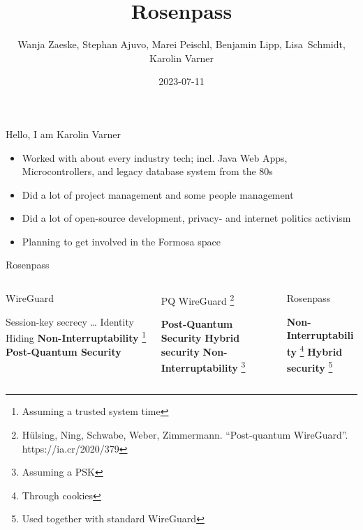 \documentclass{rosenpass-beamer}
\title{Rosenpass}
\author{
Wanja Zaeske, Stephan Ajuvo, Marei Peischl, Benjamin Lipp, Lisa~Schmidt, Karolin Varner
}
\institute{\url{https://rosenpass.eu}}
\date{2023-07-11}
\newcommand*{\heading}[1]{%
  {%
    \hspace*{-0.5cm}#1
    \vspace{1.0em}%
  }%
}
\begin{document}
\maketitle

\begin{frame}{Hello, I am Karolin Varner}
\begin{itemize}
  \item Worked with about every industry tech; incl. Java Web Apps, Microcontrollers, and legacy database system from the 80s
  \item Did a lot of project management and some people management
  \item Did a lot of open-source development, privacy- and internet politics activism
  \item Planning to get involved in the Formosa space
\end{itemize}
\end{frame}

\begin{frame}{Rosenpass}

\vspace{0.5em}
\begin{columns}[t]
\begin{column}{.30\textwidth}
\heading{WireGuard}
\begin{itemize}
  \itemtick Session-key secrecy
  \itemtick \dots
  \itemtick Identity Hiding
  \itemfail \textbf{Non-Interruptability} \footnote[frame]{Assuming a trusted system time}
  \itemfail \textbf{Post-Quantum Security}
\end{itemize}
\end{column}

\begin{column}{.30\textwidth}
\heading{
  PQ WireGuard
  \footnote[frame]{
	  Hülsing, Ning, Schwabe, Weber, Zimmermann. “Post-quantum WireGuard”. https://ia.cr/2020/379
	}
}
\begin{itemize}
  \itemtick \textbf{Post-Quantum Security}
  \itemfail \textbf{Hybrid security}
  \itemfail \textbf{Non-Interruptability} \footnote[frame]{Assuming a PSK}
\end{itemize}
\end{column}

\begin{column}{.30\textwidth}
\heading{Rosenpass}
\begin{itemize}
  \itemtick \textbf{Non-Interruptability} \footnote[frame]{Through cookies}
  \itemtick \textbf{Hybrid security} \footnote[frame]{Used together with standard WireGuard}
\end{itemize}
\end{column}

\end{columns}
\vspace{1.5em}

\end{frame}
\end{document}
